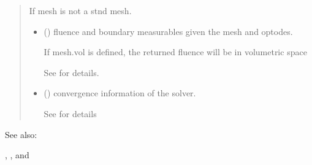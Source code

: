 \documentclass[letterpaper,10pt,english]{sphinxmanual}
\begin{document}
\begin{fulllineitems}
\begin{quote}
\begin{description}
\begin{itemize}
\end{itemize}

\sphinxAtStartPar
{} \textendash{} If mesh is not a stnd mesh.

\sphinxAtStartPar
\begin{itemize}
\item {} 
\sphinxAtStartPar
{} () \textendash{} fluence and boundary measurables given the mesh and optodes.

\sphinxAtStartPar
If mesh.vol is defined, the returned fluence will be in volumetric space

\sphinxAtStartPar
See {\hyperref[\detokenize{_autosummary/nirfasterff.base.data.FDdata:nirfasterff.base.data.FDdata}]{}} for details.

\item {} 
\sphinxAtStartPar
{} () \textendash{} convergence information of the solver.

\sphinxAtStartPar
See {\hyperref[\detokenize{_autosummary/nirfasterff.utils.ConvergenceInfo:nirfasterff.utils.ConvergenceInfo}]{}} for details

\end{itemize}


\end{description}\end{quote}


\begin{sphinxseealso}{See also:}

\sphinxAtStartPar
{\hyperref[\detokenize{_autosummary/nirfasterff.math.get_field_CW:nirfasterff.math.get_field_CW}]{}}, {\hyperref[\detokenize{_autosummary/nirfasterff.math.gen_mass_matrix:nirfasterff.math.gen_mass_matrix}]{}}, and {\hyperref[\detokenize{_autosummary/nirfasterff.math.gen_sources:nirfasterff.math.gen_sources}]{}}


\end{sphinxseealso}


\end{fulllineitems}
\end{document}
